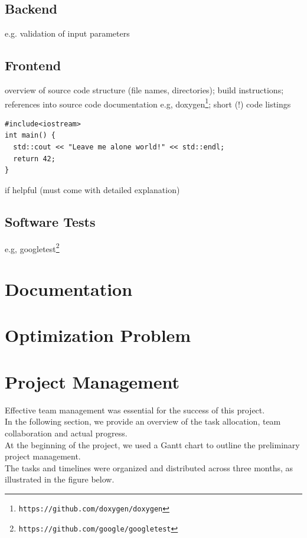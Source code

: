 \documentclass{article}
\begin{document}
\subsection{Backend}
e.g. validation of input parameters

\subsection{Frontend}

overview of source code structure (file names, directories); build instructions; references into source code documentation e.g, doxygen\footnote{\tt https://github.com/doxygen/doxygen}; short (!) code listings
\begin{lstlisting}
#include<iostream>
int main() {
  std::cout << "Leave me alone world!" << std::endl;
  return 42;
}
\end{lstlisting}
if helpful (must come with detailed explanation)

\subsection{Software Tests}

e.g, googletest\footnote{\tt https://github.com/google/googletest}

\section{Documentation}\label{ch:doc}

\section{Optimization Problem}\label{ch:optimization-problem}



\section{Project Management} \label{ch:projectmanagement}

Effective team management was essential for the success of this project.\\
In the following section, we provide an overview of the task allocation, team collaboration and actual progress.\\
At the beginning of the project, we used a Gantt chart to outline the preliminary project management.\\
The tasks and timelines were organized and distributed across three months, as illustrated in the figure below.
\end{document}
